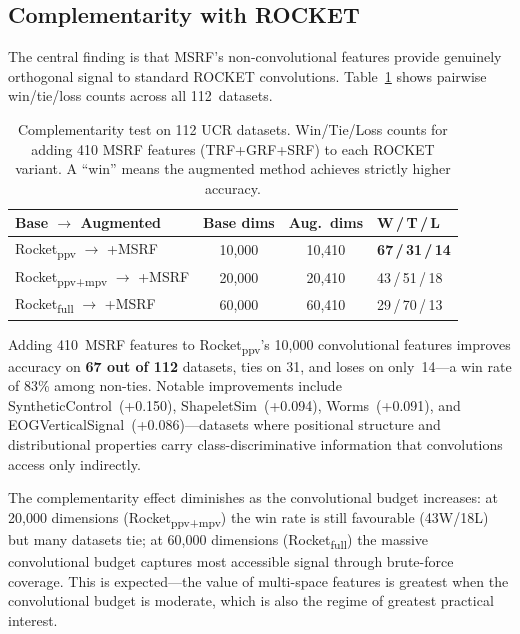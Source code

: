 \documentclass{article}
\begin{document}
\subsection{Complementarity with ROCKET}
\label{sec:complementarity}

The central finding is that MSRF's non-convolutional features provide genuinely orthogonal signal to standard ROCKET convolutions.
Table~\ref{tab:complementarity} shows pairwise win/tie/loss counts across all 112~datasets.

\begin{table}[t]
  \caption{Complementarity test on 112 UCR datasets. Win/Tie/Loss counts for adding 410 MSRF features (TRF+GRF+SRF) to each ROCKET variant. A ``win'' means the augmented method achieves strictly higher accuracy.}
  \label{tab:complementarity}
  \centering
  \small
  \begin{tabular}{@{}lccl@{}}
    \toprule
    Base $\to$ Augmented & Base dims & Aug.\ dims & W\,/\,T\,/\,L \\
    \midrule
    Rocket\textsubscript{ppv} $\to$ +MSRF       & 10{,}000 & 10{,}410 & \textbf{67\,/\,31\,/\,14} \\
    Rocket\textsubscript{ppv+mpv} $\to$ +MSRF    & 20{,}000 & 20{,}410 & 43\,/\,51\,/\,18 \\
    Rocket\textsubscript{full} $\to$ +MSRF       & 60{,}000 & 60{,}410 & 29\,/\,70\,/\,13 \\
    \bottomrule
  \end{tabular}
\end{table}

Adding 410~MSRF features to Rocket\textsubscript{ppv}'s 10{,}000 convolutional features improves accuracy on \textbf{67 out of 112} datasets, ties on 31, and loses on only~14---a win rate of 83\% among non-ties.
Notable improvements include SyntheticControl~(+0.150), ShapeletSim~(+0.094), Worms~(+0.091), and EOGVerticalSignal~(+0.086)---datasets where positional structure and distributional properties carry class-discriminative information that convolutions access only indirectly.

The complementarity effect diminishes as the convolutional budget increases: at 20{,}000 dimensions (Rocket\textsubscript{ppv+mpv}) the win rate is still favourable (43W/18L) but many datasets tie; at 60{,}000 dimensions (Rocket\textsubscript{full}) the massive convolutional budget captures most accessible signal through brute-force coverage.
This is expected---the value of multi-space features is greatest when the convolutional budget is moderate, which is also the regime of greatest practical interest.
\end{document}
